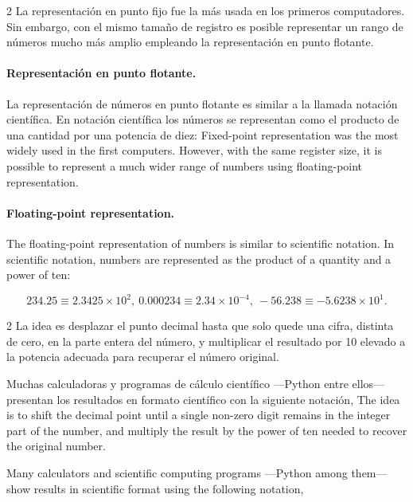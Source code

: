 \begin{paracol}{2}
La representación en punto fijo fue la más usada en los primeros computadores. Sin embargo, con el mismo tamaño de registro es posible representar un rango de números mucho más amplio empleando la representación en punto flotante.

\paragraph*{Representación en punto flotante.} 
La representación de números en punto flotante es similar a la llamada notación científica.  En notación científica los números se representan como el producto de una cantidad por una potencia de diez:
\switchcolumn
Fixed-point representation was the most widely used in the first computers. However, with the same register size, it is possible to represent a much wider range of numbers using floating-point representation.

\paragraph{Floating-point representation.} 
The floating-point representation of numbers is similar to scientific notation. In scientific notation, numbers are represented as the product of a quantity and a power of ten:
\end{paracol}
\begin{equation*}
234.25\equiv 2.3425\times 10^2,\ 0.000234\equiv 2.34\times 10^{-4},\ -56.238 \equiv -5.6238\times 10^1.
\end{equation*}

\begin{paracol}{2}
La idea es desplazar el punto decimal hasta que solo quede una cifra, distinta de cero, en la parte entera del número, y multiplicar el resultado por 10 elevado a la potencia adecuada para recuperar el número original.

Muchas calculadoras y programas de cálculo científico ---Python entre ellos--- presentan los resultados en formato científico con la siguiente notación,
\switchcolumn
The idea is to shift the decimal point until a single non-zero digit remains in the integer part of the number, and multiply the result by the power of ten needed to recover the original number.

Many calculators and scientific computing programs ---Python among them--- show results in scientific format using the following notation,
\end{paracol}


